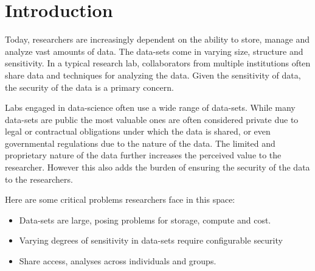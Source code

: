 \section{Introduction}



Today, researchers are increasingly dependent on the ability to store, manage and analyze vast amounts of
data. The data-sets come in varying size, structure and sensitivity. 
In a typical research lab, collaborators from multiple institutions often share data and techniques
for analyzing the data. Given the sensitivity of data, the security of the data is a primary concern.


Labs engaged in data-science often use a wide range of data-sets. While many data-sets are public the most
valuable ones are often considered private due to legal or contractual obligations under which the data
is shared, or even governmental regulations due to the nature of the data. The limited and proprietary nature
of the data further increases the perceived value to the researcher. However this also adds the burden of
ensuring the security of the data to the researchers.


Here are some critical problems researchers face in this space:

\begin{itemize}
\item Data-sets are large, posing problems for storage, compute and cost.
\item Varying degrees of sensitivity in data-sets require configurable security
\item Share access, analyses across individuals and groups.
\end{itemize}





